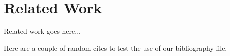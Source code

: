 \section{Related Work}
\label{sec:related}

Related work goes here...

Here are a couple of random cites \cite{Muller:2011wy,Peterson:2010hf} to
test the use of our bibliography file.
